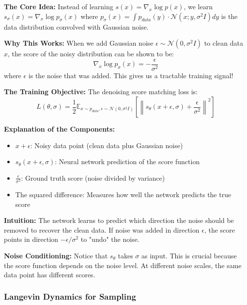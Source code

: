 \documentclass[journal]{IEEEtran}
\begin{document}
\textbf{The Core Idea:} Instead of learning $s(x) = \nabla_x \log p(x)$, we learn $s_\sigma(x) = \nabla_x \log p_\sigma(x)$ where $p_\sigma(x) = \int p_{data}(y) \cdot \mathcal{N}(x; y, \sigma^2 I) dy$ is the data distribution convolved with Gaussian noise.

\textbf{Why This Works:} When we add Gaussian noise $\epsilon \sim \mathcal{N}(0, \sigma^2 I)$ to clean data $x$, the score of the noisy distribution can be shown to be:
\begin{equation}
\nabla_x \log p_\sigma(x) = -\frac{\epsilon}{\sigma^2}
\end{equation}
where $\epsilon$ is the noise that was added. This gives us a tractable training signal!

\textbf{The Training Objective:} The denoising score matching loss is:
\begin{equation}
L(\theta, \sigma) = \frac{1}{2}\mathbb{E}_{x \sim p_{data}, \epsilon \sim \mathcal{N}(0,\sigma^2I)} \left[\left\|s_\theta(x+\epsilon, \sigma) + \frac{\epsilon}{\sigma^2}\right\|^2\right]
\end{equation}

\textbf{Explanation of the Components:}
\begin{itemize}
    \item $x + \epsilon$: Noisy data point (clean data plus Gaussian noise)
    \item $s_\theta(x+\epsilon, \sigma)$: Neural network prediction of the score function
    \item $\frac{\epsilon}{\sigma^2}$: Ground truth score (noise divided by variance)
    \item The squared difference: Measures how well the network predicts the true score
\end{itemize}

\textbf{Intuition:} The network learns to predict which direction the noise should be removed to recover the clean data. If noise was added in direction $\epsilon$, the score points in direction $-\epsilon/\sigma^2$ to "undo" the noise.

\textbf{Noise Conditioning:} Notice that $s_\theta$ takes $\sigma$ as input. This is crucial because the score function depends on the noise level. At different noise scales, the same data point has different scores.

\subsubsection{Langevin Dynamics for Sampling}
\end{document}
